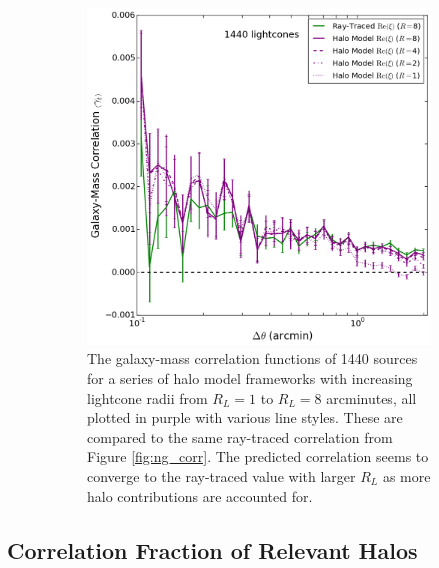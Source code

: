 \documentclass[%
 reprint,
 amsmath,amssymb,
 aps,nofootinbib
]{revtex4-1}
\begin{document}
\begin{figure}
\begin{subfigure}{0.475\textwidth}
        \includegraphics[width=\textwidth]{figs-swe/thesis/ng_progression.png}
        \captionsetup{justification=raggedright,singlelinecheck=false}
        \caption{The galaxy-mass correlation functions of 1440 sources for a series of halo model frameworks with increasing lightcone radii from $R_L=1$ to $R_L=8$ arcminutes, all plotted in purple with various line styles. These are compared to the same ray-traced correlation from Figure \ref{fig:ng_corr}. The predicted correlation seems to converge to the ray-traced value with larger $R_L$ as more halo contributions are accounted for.}
        \label{fig:ng_corr_series}
    \end{subfigure}
    \caption{}
\end{figure}
%

\subsection{Correlation Fraction of Relevant Halos} \label{halo_fraction}
\end{document}
